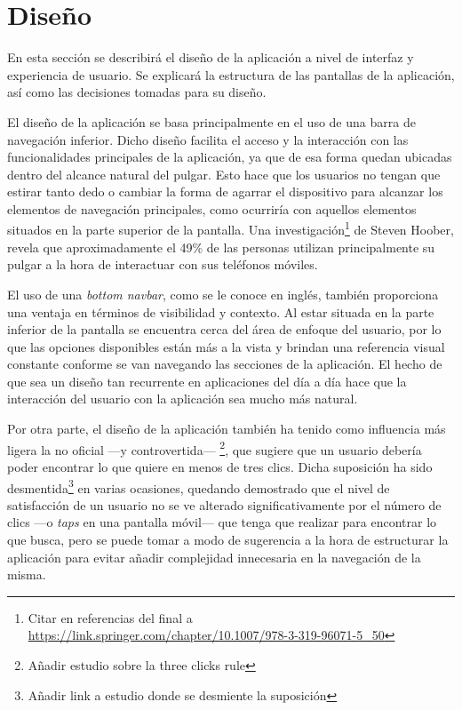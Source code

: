 
\section{Diseño}\label{sec:diseno}

En esta sección se describirá el diseño de la aplicación a nivel de interfaz y experiencia de usuario. Se explicará la estructura de las pantallas de la aplicación, así como las decisiones tomadas para su diseño.

El diseño de la aplicación se basa principalmente en el uso de una barra de navegación inferior. Dicho diseño facilita el acceso y la interacción con las funcionalidades principales de la aplicación, ya que de esa forma quedan ubicadas dentro del alcance natural del pulgar. Esto hace que los usuarios no tengan que estirar tanto dedo o cambiar la forma de agarrar el dispositivo para alcanzar los elementos de navegación principales, como ocurriría con aquellos elementos situados en la parte superior de la pantalla. Una investigación\footnote{Citar en referencias del final a \url{https://link.springer.com/chapter/10.1007/978-3-319-96071-5_50}} de Steven Hoober, revela que aproximadamente el 49\% de las personas utilizan principalmente su pulgar a la hora de interactuar con sus teléfonos móviles.

El uso de una \textit{bottom navbar}, como se le conoce en inglés, también proporciona una ventaja en términos de visibilidad y contexto. Al estar situada en la parte inferior de la pantalla se encuentra cerca del área de enfoque del usuario, por lo que las opciones disponibles están más a la vista y brindan una referencia visual constante conforme se van navegando las secciones de la aplicación. El hecho de que sea un diseño tan recurrente en aplicaciones del día a día hace que la interacción del usuario con la aplicación sea mucho más natural.

Por otra parte, el diseño de la aplicación también ha tenido como influencia más ligera la no oficial —y controvertida— \footnote{Añadir estudio sobre la three clicks rule}, que sugiere que un usuario debería poder encontrar lo que quiere en menos de tres clics. Dicha suposición ha sido desmentida\footnote{Añadir link a estudio donde se desmiente la suposición} en varias ocasiones, quedando demostrado que el nivel de satisfacción de un usuario no se ve alterado significativamente por el número de clics —o \textit{taps} en una pantalla móvil— que tenga que realizar para encontrar lo que busca, pero se puede tomar a modo de sugerencia a la hora de estructurar la aplicación para evitar añadir complejidad innecesaria en la navegación de la misma.

